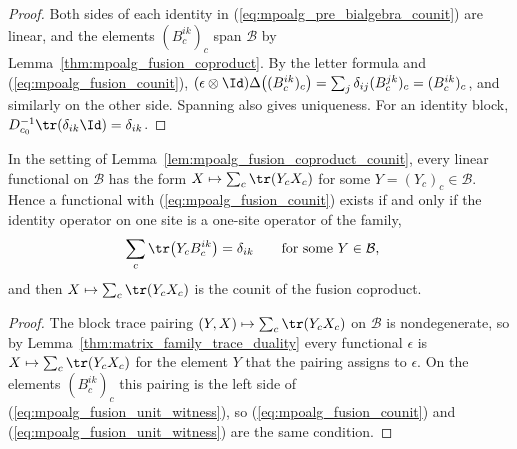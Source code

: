 \begin{proof}
    \leanok
    Both sides of each identity in (\ref{eq:mpoalg_pre_bialgebra_counit})
    are linear, and the elements $(B_c^{ik})_c$ span $\mathcal B$ by
    Lemma~\ref{thm:mpoalg_fusion_coproduct}. By the letter formula and
    (\ref{eq:mpoalg_fusion_counit}),
    $(\epsilon\otimes\Id)\Delta\big((B_c^{ik})_c\big)
        =\sum_j\delta_{ij}(B_c^{jk})_c=(B_c^{ik})_c$, and similarly on the
    other side. Spanning also gives uniqueness. For an identity block,
    $D_{c_0}^{-1}\tr(\delta_{ik}\Id)=\delta_{ik}$.
\end{proof}

\begin{lemma}%
    \label{lem:mpoalg_fusion_counit_existence}
    \leanok
    In the setting of Lemma~\ref{lem:mpoalg_fusion_coproduct_counit}, every
    linear functional on $\mathcal B$ has the form
    $X\mapsto\sum_c\tr(Y_cX_c)$ for some $Y=(Y_c)_c\in\mathcal B$. Hence a
    functional with (\ref{eq:mpoalg_fusion_counit}) exists if and only if the
    identity operator on one site is a one-site operator of the family,
    \begin{align}
        \sum_c\tr\big(Y_cB_c^{ik}\big)
         & =\delta_{ik}
        \qquad\text{for some }Y\in\mathcal B,
        \label{eq:mpoalg_fusion_unit_witness}
    \end{align}
    and then $X\mapsto\sum_c\tr(Y_cX_c)$ is the counit of the fusion
    coproduct.
\end{lemma}

\begin{proof}
    \leanok
    The block trace pairing $(Y,X)\mapsto\sum_c\tr(Y_cX_c)$ on $\mathcal B$
    is nondegenerate, so by Lemma~\ref{thm:matrix_family_trace_duality} every
    functional $\epsilon$ is $X\mapsto\sum_c\tr(Y_cX_c)$ for the element $Y$
    that the pairing assigns to $\epsilon$. On the
    elements $(B_c^{ik})_c$ this pairing is the left side of
    (\ref{eq:mpoalg_fusion_unit_witness}), so (\ref{eq:mpoalg_fusion_counit})
    and (\ref{eq:mpoalg_fusion_unit_witness}) are the same condition.
\end{proof}

